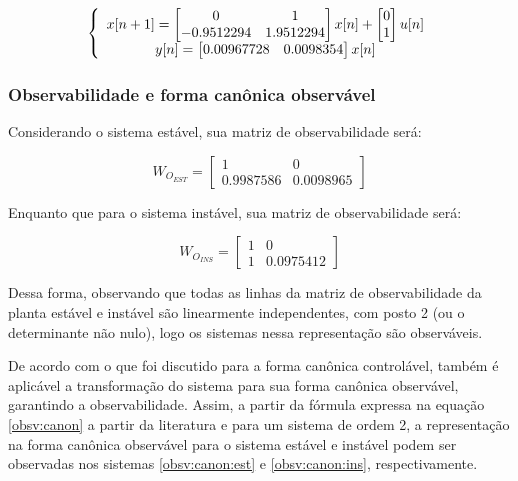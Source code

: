 \begin{equation} \label{ctrl:canon:ins}
\centering
\left \{
\begin{array}{cc}
x[n+1] = \begin{bmatrix} 0 & 1 \\ -0.9512294 & 1.9512294 \end{bmatrix} x[n] + \begin{bmatrix} 0 \\ 1 \end{bmatrix} u[n] \\
y[n] = \begin{bmatrix} 0.00967728 & 0.0098354  \end{bmatrix} x[n] \\
\end{array}
\right.
\end{equation}

\subsubsection{Observabilidade e forma canônica observável}

Considerando o sistema estável, sua matriz de observabilidade será:

\begin{equation} \label{obsv:1}
    W_{O_{EST}} = \begin{bmatrix}  1 & 0\\ 0.9987586 & 0.0098965\end{bmatrix}
\end{equation}

Enquanto que para o sistema instável, sua matriz de observabilidade será:

\begin{equation} \label{obsv:2}
    W_{O_{INS}} = \begin{bmatrix}  1 & 0\\ 1 & 0.0975412\end{bmatrix}
\end{equation}

Dessa forma, observando que todas as linhas da matriz de observabilidade da planta estável e instável são linearmente independentes, com posto 2 (ou o determinante não nulo), logo os sistemas nessa representação são observáveis.

De acordo com o que foi discutido para a forma canônica controlável, também é aplicável a transformação do sistema para sua forma canônica observável, garantindo a observabilidade. Assim, a partir da fórmula expressa na equação \ref{obsv:canon} a partir da literatura e para um sistema de ordem 2, a representação na forma canônica observável para o sistema estável e instável podem ser observadas nos sistemas \ref{obsv:canon:est} e \ref{obsv:canon:ins}, respectivamente.

